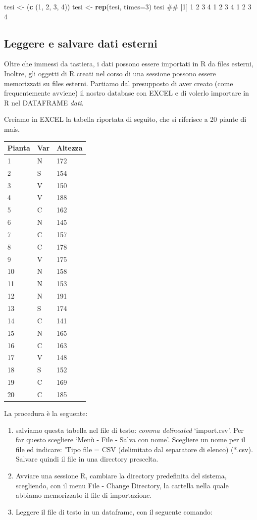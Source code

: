 \documentclass[a4paper,12pt,oneside]{book}
\providecommand{\tightlist}{%
  \setlength{\itemsep}{0pt}\setlength{\parskip}{0pt}}
\newenvironment{Shaded}{\begin{snugshade}}{\end{snugshade}}
\newcommand{\KeywordTok}[1]{\textcolor[rgb]{0.13,0.29,0.53}{\textbf{#1}}}
\newcommand{\DataTypeTok}[1]{\textcolor[rgb]{0.13,0.29,0.53}{#1}}
\newcommand{\DecValTok}[1]{\textcolor[rgb]{0.00,0.00,0.81}{#1}}
\newcommand{\StringTok}[1]{\textcolor[rgb]{0.31,0.60,0.02}{#1}}
\newcommand{\NormalTok}[1]{#1}
\theoremstyle{definition}
\theoremstyle{definition}
\theoremstyle{definition}
\theoremstyle{remark}
\begin{document}
\begin{Shaded}
\begin{Highlighting}[]
\NormalTok{tesi  <-}\StringTok{  }\NormalTok{(}\KeywordTok{c}\NormalTok{ (}\DecValTok{1}\NormalTok{, }\DecValTok{2}\NormalTok{, }\DecValTok{3}\NormalTok{, }\DecValTok{4}\NormalTok{))}
\NormalTok{tesi <-}\StringTok{ }\KeywordTok{rep}\NormalTok{(tesi, }\DataTypeTok{times=}\DecValTok{3}\NormalTok{)}
\NormalTok{tesi}
\NormalTok{##  [1] 1 2 3 4 1 2 3 4 1 2 3 4}
\end{Highlighting}
\end{Shaded}

\subsection*{Leggere e salvare dati
esterni}\label{leggere-e-salvare-dati-esterni}

Oltre che immessi da tastiera, i dati possono essere importati in R da
files esterni, Inoltre, gli oggetti di R creati nel corso di una
sessione possono essere memorizzati su files esterni. Partiamo dal
presupposto di aver creato (come frequentemente avviene) il nostro
database con EXCEL e di volerlo importare in R nel DATAFRAME
\emph{dati}.

Creiamo in EXCEL la tabella riportata di seguito, che si riferisce a 20
piante di mais.

\begin{longtable}[]{@{}lll@{}}
\toprule
Pianta & Var & Altezza\tabularnewline
\midrule
\endhead
1 & N & 172\tabularnewline
2 & S & 154\tabularnewline
3 & V & 150\tabularnewline
4 & V & 188\tabularnewline
5 & C & 162\tabularnewline
6 & N & 145\tabularnewline
7 & C & 157\tabularnewline
8 & C & 178\tabularnewline
9 & V & 175\tabularnewline
10 & N & 158\tabularnewline
11 & N & 153\tabularnewline
12 & N & 191\tabularnewline
13 & S & 174\tabularnewline
14 & C & 141\tabularnewline
15 & N & 165\tabularnewline
16 & C & 163\tabularnewline
17 & V & 148\tabularnewline
18 & S & 152\tabularnewline
19 & C & 169\tabularnewline
20 & C & 185\tabularnewline
\bottomrule
\end{longtable}

La procedura è la seguente:

\begin{enumerate}
\def\labelenumi{\arabic{enumi}.}
\tightlist
\item
  salviamo questa tabella nel file di testo: \emph{comma delineated}
  `import.csv'. Per far questo scegliere `Menù - File - Salva con nome'.
  Scegliere un nome per il file ed indicare: 'Tipo file = CSV
  (delimitato dal separatore di elenco) (*.csv). Salvare quindi il file
  in una directory prescelta.
\item
  Avviare una sessione R, cambiare la directory predefinita del sistema,
  scegliendo, con il menu File - Change Directory, la cartella nella
  quale abbiamo memorizzato il file di importazione.
\item
  Leggere il file di testo in un dataframe, con il seguente comando:
\end{enumerate}
\end{document}
